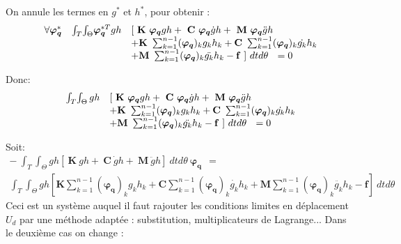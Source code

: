 \documentclass[12pt,a4paper]{report}
\begin{document}
On annule les termes en $g^*$ et $h^*$, pour obtenir :
\begin{equation}
\begin{array}{r r l}
	\forall \boldsymbol{\varphi_q}^*
	&\int_T \! \int_\Theta \!		\boldsymbol{\varphi_q}^{*T}gh &
						[~\mathbf{K}~ \boldsymbol{\varphi_q}gh
						+ ~\mathbf{C}~ \boldsymbol{\varphi_q} \dot{g}h 
						+ ~\mathbf{M}~ \boldsymbol{\varphi_q} \ddot{g}h
	\\ &&
			+ \mathbf{K}~ \sum_{k=1}^{n-1} (\boldsymbol{\varphi_q})_k       g_k  h_k 
			+  \mathbf{C}~ \sum_{k=1}^{n-1} (\boldsymbol{\varphi_q})_k  \dot{g_k} h_k 
	\\ && 
			+  \mathbf{M}~ \sum_{k=1}^{n-1} (\boldsymbol{\varphi_q})_k \ddot{g_k} h_k
			-\mathbf{f}~] ~dt d\theta ~~= 0
\end{array}
\end{equation}

\noindent
Donc:
\begin{equation}
\begin{array}{r l}
	\int_T \! \int_\Theta 	gh &
			[~\mathbf{K}~ \boldsymbol{\varphi_q}gh
			+ ~\mathbf{C}~ \boldsymbol{\varphi_q} \dot{g}h 
			+ ~\mathbf{M}~ \boldsymbol{\varphi_q} \ddot{g}h
	\\ &
			+ \mathbf{K}~ \sum_{k=1}^{n-1} (\boldsymbol{\varphi_q})_k       g_k  h_k 
			+  \mathbf{C}~ \sum_{k=1}^{n-1} (\boldsymbol{\varphi_q})_k  \dot{g_k} h_k 
	\\ &
			+  \mathbf{M}~ \sum_{k=1}^{n-1} (\boldsymbol{\varphi_q})_k \ddot{g_k} h_k
	  		- \mathbf{f}~] ~dt d\theta ~~= 0
\end{array}
\end{equation}

\noindent
Soit:
\begin{equation}
\begin{array}{l}
	-~ \displaystyle
		\int_T \! \int_\Theta
			gh [  ~\mathbf{K}~ gh
				+ ~\mathbf{C}~ \dot{g}h 
				+ ~\mathbf{M}~ \ddot{g}h
				] ~dt d\theta 
	~ \boldsymbol{\varphi_q}
	~~=
	\\
	\displaystyle
		\int_T \! \int_\Theta \!
			gh [  \mathbf{K} \! \sum_{k=1}^{n-1} (\boldsymbol{\varphi_q})_k       g_k  h_k 
				+ \mathbf{C} \! \sum_{k=1}^{n-1} (\boldsymbol{\varphi_q})_k  \dot{g_k} h_k 
				+ \mathbf{M} \! \sum_{k=1}^{n-1} (\boldsymbol{\varphi_q})_k \ddot{g_k} h_k
				- \mathbf{f}] ~dt d\theta				
\end{array}
\end{equation}
Ceci est un système auquel il faut rajouter les conditions limites en déplacement $U_d$ par une méthode adaptée : substitution, multiplicateurs de Lagrange... Dans le deuxième cas on change :
\end{document}
